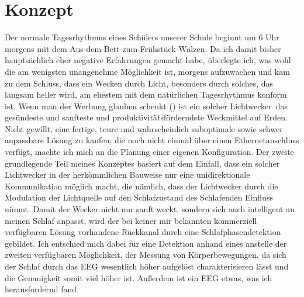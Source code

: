 \documentclass[12pt,a4paper,notitlepage]{article}
\begin{document}
\section{Konzept}
Der normale Tagesrhythmus eines Schülers unserer Schule beginnt um 6 Uhr morgens mit dem Aus-dem-Bett-zum-Frühstück-Wälzen. Da ich damit bisher hauptsächlich eher negative Erfahrungen gemacht habe, überlegte ich, was wohl die am wenigsten unangenehme Möglichkeit ist, morgens aufzuwachen und kam zu dem Schluss, dass ein Wecken durch Licht, besonders durch solches, das langsam heller wird, am ehestem mit dem natürlichen Tagesrhythmus konform ist. Wenn man der Werbung glauben schenkt (\cite{WERBUNG1}\cite{WERBUNG2}\cite{WERBUNG3}\cite{WERBUNG4}\cite{WERBUNG5}\cite{WERBUNG6}\cite{WERBUNG7}\cite{WERBUNG8})
ist ein solcher \glqq Lichtwecker\grqq\ das gesündeste und sanfteste und produktivitätsförderndste Weckmittel auf Erden\cite{SIESTA1}. Nicht gewillt, eine fertige, teure und wahrscheinlich suboptimale sowie schwer anpassbare Lösung zu kaufen, die noch nicht einmal über einen Ethernetanschluss verfügt, machte ich mich an die Planung einer eigenen Konfiguration. Der zweite grundlegende Teil meines Konzeptes basiert auf dem Einfall, dass ein solcher Lichtwecker in der herkömmlichen Bauweise nur eine unidirektionale Kommunikation möglich macht, die nämlich, dass der Lichtwecker durch die Modulation der Lichtquelle auf den Schlafzustand des Schlafenden Einfluss nimmt. Damit der Wecker nicht nur sanft weckt, sondern sich auch intelligent an meinen Schlaf anpasst, wird der bei keiner mir bekannten kommerziell verfügbaren Lösung vorhandene Rückkanal durch eine Schlafphasendetektion gebildet. Ich entschied mich dabei für eine Detektion anhand eines  anstelle der zweiten verfügbaren Möglichkeit, der Messung von Körperbewegungen, da sich der Schlaf durch das EEG wesentlich höher aufgelöst charakterisieren lässt und die Genauigkeit somit viel höher ist. Außerdem ist ein EEG etwas, was ich herausfordernd fand.

\end{document}
